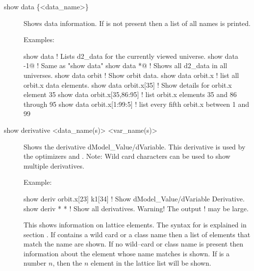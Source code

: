{{{\begin{description}

\item[show data \{<data\_name>\}] \Newline
Shows data information. If  is not
present then a list of all  names is printed.

Examples:
\begin{example}
  show data                   ! Lists d2_data for the currently viewed universe.
  show data -1@               ! Same as "show data"
  show data *@                ! Shows all d2_data in all universes.
  show data orbit             ! Show orbit data.
  show data orbit.x           ! list all orbit.x data elements.
  show data orbit.x[35]       ! Show details for orbit.x element 35
  show data orbit.x[35,86:95] ! list orbit.x elements 35 and 86 through 95
  show data orbit.x[1:99:5]   ! list every fifth orbit.x between 1 and 99  
\end{example}


\item[show derivative <data\_name(s)> <var\_name(s)>] \Newline
{}
Shows the derivative dModel\_Value/dVariable. This derivative is used
by the optimizers  and . Note: Wild card characters can
be used to show multiple derivatives.

Example:
\begin{example}
  show deriv orbit.x[23] k1[34] ! Show dModel_Value/dVariable Derivative.
  show deriv * *                ! Show all derivatives. Warning! The output 
                                ! may be large.
\end{example}


\item[\protect\parbox{6in}{
  show element \{-all\_attributes\} \{-cross_section\} \\
  \hspace*{0.35in} \{-data\} \{-no_slaves\} \{-taylor\} \{-field\_coefs\} <ele\_name> }] \Newline
This shows information on lattice elements. The syntax for  
is explained in section . If
 contains a wild card or a class name then a list of
elements that match the name are shown. If no wild--card or class name
is present then information about the element whose name matches
 is shown. If  is a number $n$, then the $n$\Th
element in the lattice list will be shown.


\end{description}}}}
